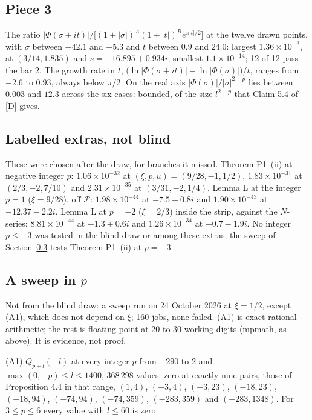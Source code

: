 \documentclass[11pt]{article}
\begin{document}
\subsection{Piece 3}

The ratio $|\Phi(\sigma+it)|/\bigl[(1+|\sigma|)^A(1+|t|)^Be^{\pi|t|/2}\bigr]$ at the twelve drawn points, with $\sigma$ between $-42.1$ and $-5.3$ and $t$ between $0.9$ and $24.0$: largest $1.36\times10^{-3}$, at $(3/14,1.835)$ and $s=-16.895+0.934i$; smallest $1.1\times10^{-14}$; 12 of 12 pass the bar $2$. The growth rate in $t$, $\bigl(\ln|\Phi(\sigma+it)|-\ln|\Phi(\sigma)|\bigr)/t$, ranges from $-2.6$ to $0.93$, always below $\pi/2$. On the real axis $|\Phi(\sigma)|/|\sigma|^{2-p}$ lies between $0.003$ and $12.3$ across the six cases: bounded, of the size $l^{2-p}$ that Claim 5.4 of [D] gives.

\subsection{Labelled extras, not blind}\label{sec:extras}

These were chosen after the draw, for branches it missed. Theorem P1~(ii) at negative integer $p$: $1.06\times10^{-32}$ at $(\xi,p,u)=(9/28,-1,1/2)$, $1.83\times10^{-31}$ at $(2/3,-2,7/10)$ and $2.31\times10^{-35}$ at $(3/31,-2,1/4)$. Lemma L at the integer $p=1$ ($\xi=9/28$), off $\mathcal{P}$: $1.98\times10^{-44}$ at $-7.5+0.8i$ and $1.90\times10^{-43}$ at $-12.37-2.2i$. Lemma L at $p=-2$ ($\xi=2/3$) inside the strip, against the $N$-series: $8.81\times10^{-44}$ at $-1.3+0.6i$ and $1.26\times10^{-34}$ at $-0.7-1.9i$. No integer $p\le-3$ was tested in the blind draw or among these extras; the sweep of Section~\ref{sec:sweep} tests Theorem P1~(ii) at $p=-3$.

\subsection{A sweep in $p$}\label{sec:sweep}

Not from the blind draw: a sweep run on 24 October 2026 at $\xi=1/2$, except (A1), which does not depend on $\xi$; 160 jobs, none failed. (A1) is exact rational arithmetic; the rest is floating point at 20 to 30 working digits (mpmath, as above). It is evidence, not proof.

(A1) $Q_{p+l}(-l)$ at every integer $p$ from $-290$ to $2$ and $\max(0,-p)\le l\le1400$, 368\,298 values: zero at exactly nine pairs, those of Proposition 4.4 in that range, $(1,4)$, $(-3,4)$, $(-3,23)$, $(-18,23)$, $(-18,94)$, $(-74,94)$, $(-74,359)$, $(-283,359)$ and $(-283,1348)$. For $3\le p\le6$ every value with $l\le60$ is zero.
\end{document}
